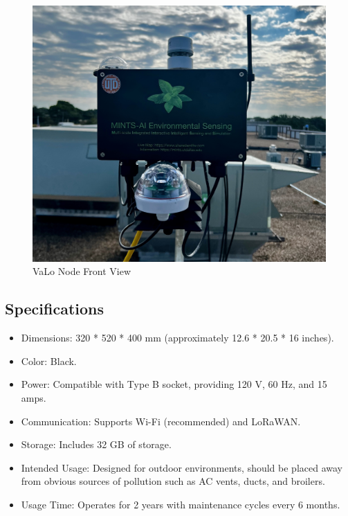 \documentclass[12pt]{article}
\begin{document}
\begin{figure}[H]
     \centering
     \includegraphics[width=15cm]{figures/valoNode.jpeg}
     \centering
    \caption{VaLo Node Front View}\label{Fig:VaLo Node_1}
\end{figure}

\clearpage

\subsection{Specifications}

\begin{itemize}
    \item Dimensions: 320 * 520 * 400 mm (approximately 12.6 * 20.5 * 16 inches).
    \item Color: Black.
    \item Power: Compatible with Type B socket, providing 120 V, 60 Hz, and 15 amps.
    \item Communication: Supports Wi-Fi (recommended) and LoRaWAN.
    \item Storage: Includes 32 GB of storage.
    \item Intended Usage: Designed for outdoor environments, should be placed away from obvious sources of pollution such as AC vents, ducts, and broilers.
    \item Usage Time: Operates for 2 years with maintenance cycles every 6 months.
\end{itemize}
\end{document}
